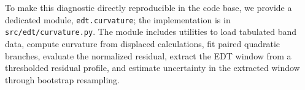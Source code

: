 To make this diagnostic directly reproducible in the code base, we provide a dedicated module, \texttt{edt.curvature}; the implementation is in \texttt{src/edt/curvature.py}. The module includes utilities to load tabulated band data, compute curvature from displaced calculations, fit paired quadratic branches, evaluate the normalized residual, extract the EDT window from a thresholded residual profile, and estimate uncertainty in the extracted window through bootstrap resampling.
